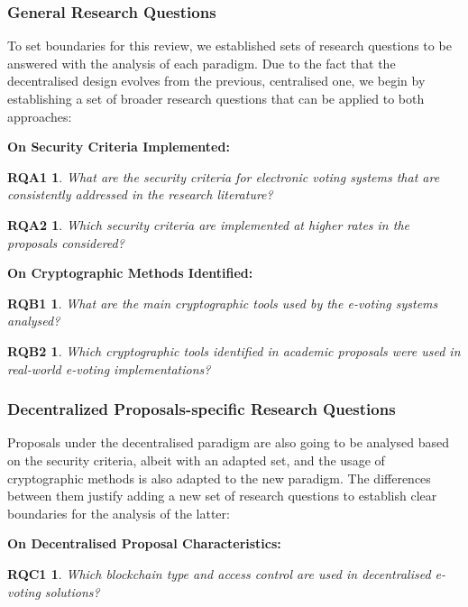 \documentclass{ieeeaccess}
\newtheorem*{rqa1}{RQA1}
\newtheorem*{rqa2}{RQA2}
\newtheorem*{rqb1}{RQB1}
\newtheorem*{rqb2}{RQB2}
\newtheorem*{rqc1}{RQC1}
\begin{document}
\subsubsection{General Research Questions}
\label{general-research-questions}
To set boundaries for this review, we established sets of research questions to be answered with the analysis of each paradigm. Due to the fact that the decentralised design evolves from the previous, centralised one, we begin by establishing a set of broader research questions that can be applied to both approaches:
\par
\vspace{0.25cm}
\textbf{On Security Criteria Implemented:}
    \begin{rqa1}
        What are the security criteria for electronic voting systems that are consistently addressed in the research literature?
    \end{rqa1}

    \begin{rqa2}
        Which security criteria are implemented at higher rates in the proposals considered?
    \end{rqa2}

\textbf{On Cryptographic Methods Identified:}
    \begin{rqb1}
        What are the main cryptographic tools used by the e-voting systems analysed?
    \end{rqb1}

    \begin{rqb2}
        Which cryptographic tools identified in academic proposals were used in real-world e-voting implementations?
    \end{rqb2}

\subsubsection{Decentralized Proposals-specific Research Questions}
\label{specific-research-questions}
Proposals under the decentralised paradigm are also going to be analysed based on the security criteria, albeit with an adapted set, and the usage of cryptographic methods is also adapted to the new paradigm. The differences between them justify adding a new set of research questions to establish clear boundaries for the analysis of the latter:
\par
\vspace{0.25cm}
\textbf{On Decentralised Proposal Characteristics:}
    \begin{rqc1}
        Which blockchain type and access control are used in decentralised e-voting solutions?
    \end{rqc1}
\end{document}
